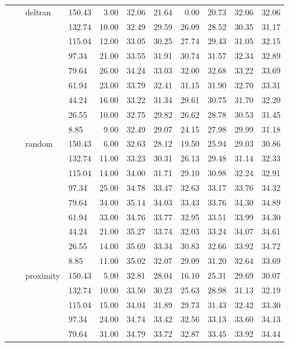 \begin{longtable}{llllrrrrrrr}
   &  & deltran & 150.43 & 3.00 & 32.06 & 21.64 & 0.00 & 20.73 & 32.06 & 32.06 \\ 
   &  &  & 132.74 & 10.00 & 32.49 & 29.59 & 26.09 & 28.52 & 30.35 & 31.17 \\ 
   &  &  & 115.04 & 12.00 & 33.05 & 30.25 & 27.74 & 29.43 & 31.05 & 32.15 \\ 
   &  &  & 97.34 & 21.00 & 33.55 & 31.91 & 30.74 & 31.57 & 32.34 & 32.89 \\ 
   &  &  & 79.64 & 26.00 & 34.24 & 33.03 & 32.00 & 32.68 & 33.22 & 33.69 \\ 
   &  &  & 61.94 & 23.00 & 33.79 & 32.41 & 31.15 & 31.90 & 32.70 & 33.31 \\ 
   &  &  & 44.24 & 16.00 & 33.22 & 31.34 & 29.61 & 30.75 & 31.70 & 32.20 \\ 
   &  &  & 26.55 & 10.00 & 32.75 & 29.82 & 26.62 & 28.78 & 30.53 & 31.45 \\ 
   &  &  & 8.85 & 9.00 & 32.49 & 29.07 & 24.15 & 27.98 & 29.99 & 31.18 \\ 
   &  & random & 150.43 & 6.00 & 32.63 & 28.12 & 19.50 & 25.94 & 29.03 & 30.86 \\ 
   &  &  & 132.74 & 11.00 & 33.23 & 30.31 & 26.13 & 29.48 & 31.14 & 32.33 \\ 
   &  &  & 115.04 & 14.00 & 34.00 & 31.71 & 29.10 & 30.98 & 32.24 & 32.91 \\ 
   &  &  & 97.34 & 25.00 & 34.78 & 33.47 & 32.63 & 33.17 & 33.76 & 34.32 \\ 
   &  &  & 79.64 & 34.00 & 35.14 & 34.03 & 33.43 & 33.76 & 34.30 & 34.89 \\ 
   &  &  & 61.94 & 33.00 & 34.76 & 33.77 & 32.95 & 33.51 & 33.99 & 34.30 \\ 
   &  &  & 44.24 & 21.00 & 35.27 & 33.74 & 32.03 & 33.24 & 34.07 & 34.61 \\ 
   &  &  & 26.55 & 14.00 & 35.69 & 33.34 & 30.83 & 32.66 & 33.92 & 34.72 \\ 
   &  &  & 8.85 & 11.00 & 35.02 & 32.07 & 29.09 & 31.20 & 32.64 & 33.69 \\ 
   &  & proximity & 150.43 & 5.00 & 32.81 & 28.04 & 16.10 & 25.31 & 29.69 & 30.07 \\ 
   &  &  & 132.74 & 10.00 & 33.50 & 30.23 & 25.63 & 28.98 & 31.13 & 32.19 \\ 
   &  &  & 115.04 & 15.00 & 34.04 & 31.89 & 29.73 & 31.43 & 32.42 & 33.30 \\ 
   &  &  & 97.34 & 24.00 & 34.74 & 33.42 & 32.56 & 33.13 & 33.60 & 34.13 \\ 
   &  &  & 79.64 & 31.00 & 34.79 & 33.72 & 32.87 & 33.45 & 33.92 & 34.44 \\ 

\end{longtable}
